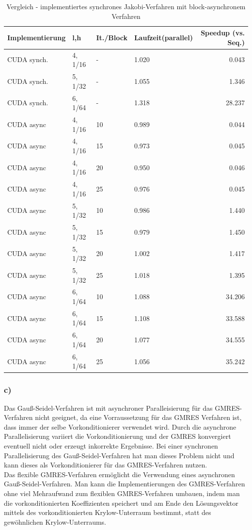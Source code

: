 \documentclass{report}
\begin{document}
\begin{table}
	\begin{tabular}{|l|l|l|l|r|}
		\hline
		Implementierung & l,h & It./Block & Laufzeit(parallel) & Speedup (vs. Seq.)\\

		\hline
		CUDA synch. & 4, 1/16 & - & 1.020 & 0.043 \\
		\hline
		CUDA synch. & 5, 1/32 & - & 1.055 & 1.346 \\
		\hline
		CUDA synch. & 6, 1/64 & - & 1.318 & 28.237 \\
		\hline
		CUDA async & 4, 1/16 & 10 & 0.989 & 0.044 \\
		\hline
		CUDA async & 4, 1/16 & 15 & 0.973 & 0.045 \\
		\hline
		CUDA async & 4, 1/16 & 20 & 0.950 & 0.046 \\
		\hline
		CUDA async & 4, 1/16 & 25 & 0.976 & 0.045 \\
		\hline
		CUDA async & 5, 1/32 & 10 & 0.986 & 1.440 \\
		\hline
		CUDA async & 5, 1/32 & 15 & 0.979 & 1.450 \\
		\hline
		CUDA async & 5, 1/32 & 20 & 1.002 & 1.417 \\
		\hline
		CUDA async & 5, 1/32 & 25 & 1.018 & 1.395 \\
		\hline
		CUDA async & 6, 1/64 & 10 & 1.088 & 34.206 \\
		\hline
		CUDA async & 6, 1/64 & 15 & 1.108 & 33.588 \\
		\hline
		CUDA async & 6, 1/64 & 20 & 1.077 & 34.555 \\
		\hline
		CUDA async & 6, 1/64 & 25 & 1.056 & 35.242 \\

		\hline 
	\end{tabular}
	\caption{Vergleich -  implementiertes synchrones Jakobi-Verfahren mit block-asynchronem Verfahren}
	\label{Table:2_3b}
\end{table}

\subsubsection{c)}
Das Gauß-Seidel-Verfahren ist mit asynchroner Paralleisierung für das GMRES-Verfahren nicht geeignet, da eine Vorraussetzung für das GMRES Verfahren ist, dass immer der selbe Vorkonditionierer verwendet wird. Durch die asynchrone Parallelisierung variiert die Vorkonditionierung und der GMRES konvergiert eventuell nicht oder erzeugt inkorrekte Ergebnisse. Bei einer synchronen Parallelisierung des Gauß-Seidel-Verfahren hat man dieses Problem nicht und kann dieses als Vorkonditionierer für das GMRES-Verfahren nutzen. \\
Das flexible GMRES-Verfahren ermöglicht die Verwendung eines asynchronen Gauß-Seidel-Verfahren. Man kann die Implementierungen des GMRES-Verfahren ohne viel Mehraufwand zum flexiblen GMRES-Verfahren umbauen, indem man die vorkonditionierten Koeffizienten speichert und am Ende den Lösungsvektor mittels des vorkonditionierten Krylow-Unterraum bestimmt, statt des gewöhnlichen Krylow-Unterraums.
\end{document}
